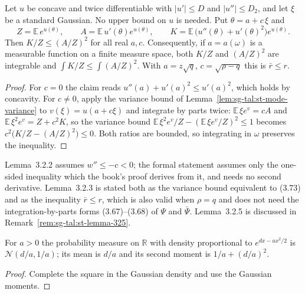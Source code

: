 \begin{lemma}\label{lem:sg-tal:st-rbar-le-r}
  \leanok
Let $u$ be concave and twice differentiable with $|u'|\le D$ and $|u''|\le D_2$, and let $\xi$ be a
standard Gaussian. No upper bound on $u$ is needed. Put $\theta=a+c\,\xi$ and
\[
Z=\mathbb E\,e^{u(\theta)},\qquad A=\mathbb E\,u'(\theta)e^{u(\theta)},\qquad
K=\mathbb E\,\bigl(u''(\theta)+u'(\theta)^2\bigr)e^{u(\theta)} .
\]
Then $K/Z\le(A/Z)^2$ for all real $a,c$. Consequently, if $a=a(\omega)$ is a measurable function on a finite
measure space, both $K/Z$ and $(A/Z)^2$ are integrable and $\int K/Z\le\int(A/Z)^2$. With $a=z\sqrt q$,
$c=\sqrt{\rho-q}$ this is $\bar r\le r$.
\end{lemma}
\begin{proof}
  \leanok
For $c=0$ the claim reads $u''(a)+u'(a)^2\le u'(a)^2$, which holds by concavity. For $c\ne0$, apply the
variance bound of Lemma~\ref{lem:sg-tal:st-mode-variance} to $v(\xi)=u(a+c\xi)$ and integrate by parts twice:
$\mathbb E\,\xi e^{v}=cA$ and $\mathbb E\,\xi^2e^{v}=Z+c^2K$, so the variance bound
$\mathbb E\,\xi^2e^v/Z-(\mathbb E\,\xi e^v/Z)^2\le1$ becomes $c^2\bigl(K/Z-(A/Z)^2\bigr)\le0$. Both ratios are
bounded, so integrating in $\omega$ preserves the inequality.
\end{proof}

\begin{remark}\label{rem:sg-tal:st-rs-tools-diff}
Lemma~3.2.2 assumes $w''\le-c<0$; the formal statement assumes only the one-sided inequality which the
book's proof derives from it, and needs no second derivative. Lemma~3.2.3 is stated both as the variance
bound equivalent to (3.73) and as the inequality $\bar r\le r$, which is also valid when $\rho=q$ and does not
need the integration-by-parts forms (3.67)--(3.68) of $\Psi$ and $\bar\Psi$. Lemma~3.2.5 is discussed in
Remark~\ref{rem:sg-tal:st-lemma-325}.
\end{remark}

\begin{lemma}\label{lem:sg-tal:st-endpoint-gaussian}
  \leanok
{}
For $a>0$ the probability measure on $\mathbb R$ with density proportional to $e^{dx-ax^2/2}$ is
$\mathcal N(d/a,1/a)$; its mean is $d/a$ and its second moment is $1/a+(d/a)^2$.
\end{lemma}
\begin{proof}
  \leanok
Complete the square in the Gaussian density and use the Gaussian moments.
\end{proof}

